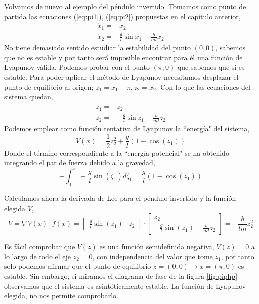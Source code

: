 \begin{example}
Volvamos de nuevo al ejemplo del péndulo invertido. Tomamos como punto de partida las ecuaciones (\ref{eq:pi1}), (\ref{eq:pi2}) propuestas en el capítulo anterior,
\begin{align*}
\dot x_1 = &x_2 \\ 
\dot x_2 = &\frac{g}{l}\sin x_1 - \frac{b}{ml}x_2 
\end{align*}
No tiene demasiado sentido estudiar la estabilidad del punto $(0,0)$, sabemos que no es estable y por tanto será imposible encontrar para él una función de Lyapunov válida. Podemos probar con el punto $(\pi,0)$ que sabemos que sí es estable. Para poder aplicar el método de Lyapunov necesitamos desplazar el punto de equilibrio al origen; $z_1=x_1-\pi,z_2=x_2$. Con lo que las ecuaciones del sistema quedan,
\begin{align*}
\dot z_1 = &z_2 \\ 
\dot z_2 = &-\frac{g}{l}\sin z_1 - \frac{b}{ml}z_2 
\end{align*}
Podemos emplear como función tentativa de Lyapunov la ``energía" del sistema,
\begin{equation*}
V(x) = \frac{1}{2}z_2^2 + \frac{g}{l}\left(1-\cos(z_1)\right)
\end{equation*}
Donde el término correspondiente a la ``energía potencial" se ha obtenido integrando el par de fuerza debido a la gravedad,
\begin{equation*}
-\int_0^{z_1}-\frac{g}{l}\sin(\zeta_1)d\zeta_1 =  \frac{g}{l}\left(1-\cos(z_1)\right)
\end{equation*}

Calculamos ahora la derivada de Lee para el péndulo invertido y la función elegida $V$,
\begin{equation*}
\dot V = \nabla V(x) \cdot f(x) = \begin{bmatrix}
\frac{g}{l}\sin(z_1) & z_2
\end{bmatrix} \cdot
\begin{bmatrix}
z_2\\
 -\frac{g}{l} \sin(z_1) - \frac{b}{ml}z_2 
\end{bmatrix}  = -\frac{b}{lm}z_2^2
\end{equation*}

Es fácil comprobar que $\dot V(z)$ es una función semidefinida negativa, $\dot V(z)=0$ a lo largo de todo el eje $z_2=0$, con independencia del valor que tome $z_1$, por tanto solo podemos afirmar que el punto de equilibrio $z=(0,0) \rightarrow x=(\pi,0)$ es estable. Sin embargo, si miramos el diagrama de fase de la figura \ref{fig:piphp} observamos que el sistema es asintóticamente estable. La función de Lyapunov elegida, no nos permite comprobarlo.


\end{example}
